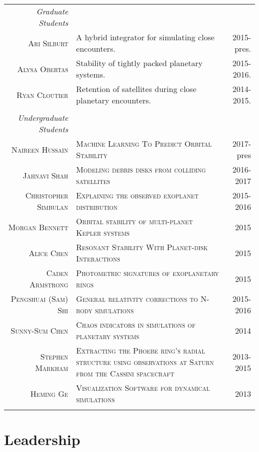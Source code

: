 \documentclass[10pt]{article} %
\begin{document}
{\begin{tabular}{r|p{9.9cm}r}
{\it Graduate Students} \\
\textsc{Ari Silburt} & A hybrid integrator for simulating close encounters. & 2015-pres. \\
\textsc{Alysa Obertas} & Stability of tightly packed planetary systems. & 2015-2016. \\
\textsc{Ryan Cloutier} & Retention of satellites during close planetary encounters. & 2014-2015. \\
\\
{\it Undergraduate Students} \\
\textsc{Naireen Hussain} & \textsc{Machine Learning To Predict Orbital Stability} & 2017-pres \\
\textsc{Jahnavi Shah} & \textsc{Modeling debris disks from colliding satellites} & 2016-2017 \\
\textsc{Christopher Simbulan} & \textsc{Explaining the observed exoplanet distribution} & 2015-2016 \\
\textsc{Morgan Bennett} & \textsc{Orbital stability of multi-planet Kepler systems} & 2015  \\
\textsc{Alice Chen} & \textsc{Resonant Stability With Planet-disk Interactions} & 2015 \\
\textsc{Caden Armstrong} & \textsc{Photometric signatures of exoplanetary rings} & 2015 \\
\textsc{Pengshuai (Sam) Shi} & \textsc{General relativity corrections to N-body simulations} & 2015-2016 \\
\textsc{Sunny-Sum Chen} & \textsc{Chaos indicators in simulations of planetary systems} & 2014 \\
\textsc{Stephen Markham} & \textsc{Extracting the Phoebe ring's radial structure using observations at Saturn from the Cassini spacecraft} & 2013-2015 \\
\textsc{Heming Ge} & \textsc{Visualization Software for dynamical simulations} & 2013 \\
\multicolumn{3}{c}{} \\
\end{tabular}


\section{Leadership}

}
\end{document}
